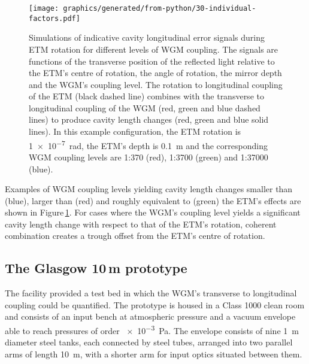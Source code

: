 \begin{figure}
  \centering
  \texttt{[image: graphics/generated/from-python/30-individual-factors.pdf]}
  \caption{\label{fig:coupling-contributions}Simulations of indicative cavity longitudinal error signals during \gls{ETM} rotation for different levels of \gls{WGM} coupling. The signals are functions of the transverse position of the reflected light relative to the \gls{ETM}'s centre of rotation, the angle of rotation, the mirror depth and the \gls{WGM}'s coupling level. The rotation to longitudinal coupling of the \gls{ETM} (black dashed line) combines with the transverse to longitudinal coupling of the \gls{WGM} (red, green and blue dashed lines) to produce cavity length changes (red, green and blue solid lines). In this example configuration, the \gls{ETM} rotation is \SI{1e-7}{\radian}, the \gls{ETM}'s depth is \SI{0.1}{\meter} and the corresponding \gls{WGM} coupling levels are 1:370 (red), 1:3700 (green) and 1:37000 (blue).}
\end{figure}

Examples of \gls{WGM} coupling levels yielding cavity length changes smaller than (blue), larger than (red) and roughly equivalent to (green) the \gls{ETM}'s effects are shown in Figure\,\ref{fig:coupling-contributions}. For cases where the \gls{WGM}'s coupling level yields a significant cavity length change with respect to that of the \gls{ETM}'s rotation, coherent combination creates a trough offset from the \gls{ETM}'s centre of rotation.

%
%

\subsection{The Glasgow 10\,m prototype}
\label{sec:glasgow10m}

The \GLASGOWTENM{} facility provided a test bed in which the \gls{WGM}'s transverse to longitudinal coupling could be quantified. The prototype is housed in a Class 1000 clean room and consists of an input bench at atmospheric pressure and a vacuum envelope able to reach pressures of order \SI{e-3}{\pascal}. The envelope consists of nine \SI{1}{\meter} diameter steel tanks, each connected by steel tubes, arranged into two parallel arms of length \SI{10}{\meter}, with a shorter arm for input optics situated between them.

